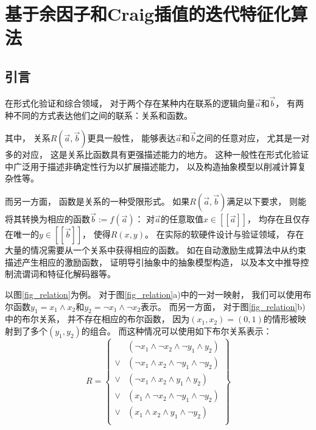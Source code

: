 \chapter{基于余因子和Craig插值的迭代特征化算法}
\label{chap:interative_craig}



\section{引言}

在形式化验证和综合领域，
对于两个存在某种内在联系的逻辑向量$\vec{a}$和$\vec{b}$，
有两种不同的方式表达他们之间的联系：关系和函数。

其中，
关系$R(\vec{a},\vec{b})$更具一般性，
能够表达$\vec{a}$和$\vec{b}$之间的任意对应，
尤其是一对多的对应，
这是关系比函数具有更强描述能力的地方。
这种一般性在形式化验证中广泛用于描述非确定性行为以扩展描述能力，
以及构造抽象模型以削减计算复杂性等。

而另一方面，
函数是关系的一种受限形式。
如果$R(\vec{a},\vec{b})$满足以下要求，
则能将其转换为相应的函数$\vec{b}:=f(\vec{a})$：
对$\vec{a}$的任意取值$x\in[\![\vec{a}]\!]$，
均存在且仅存在唯一的$y\in[\![\vec{b}]\!]$，
使得$R(x,y)$。
在实际的软硬件设计与验证领域，
存在大量的情况需要从一个关系中获得相应的函数。
如在自动激励生成算法中从约束描述产生相应的激励函数，
证明导引抽象中的抽象模型构造，
以及本文中推导控制流谓词和特征化解码器等。

以图\ref{fig_relation}为例。
对于图\ref{fig_relation}a)中的一对一映射，
我们可以使用布尔函数$y_1=x_1\wedge x_2$和$y_2=\neg x_1\wedge \neg x_2$表示。
而另一方面，
对于图\ref{fig_relation}b)中的布尔关系，
并不存在相应的布尔函数，
因为$(x_1,x_2)=(0,1)$的情形被映射到了多个$(y_1,y_2)$的组合。
而这种情况可以使用如下布尔关系表示：
\begin{equation}
R=
\left\{
\begin{array}{cc}
     & (\neg x_1\wedge\neg x_2\wedge \neg y_1\wedge y_2)\\
\vee & (\neg x_1\wedge x_2\wedge \neg y_1\wedge \neg y_2)\\
\vee & (\neg x_1\wedge x_2\wedge y_1\wedge y_2)\\
\vee & (x_1\wedge \neg x_2\wedge \neg y_1 \wedge \neg y_2)\\
\vee & (x_1\wedge x_2\wedge y_1\wedge \neg y_2)\\
\end{array}
\right\}
\end{equation}

